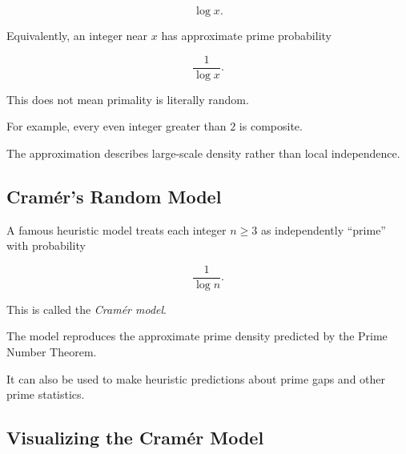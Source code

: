 \[ \log x. \]

Equivalently, an integer near \(x\) has approximate prime probability

\[ \frac1{\log x}. \]

This does not mean primality is literally random.

For example, every even integer greater than \(2\) is composite.

The approximation describes large-scale density rather than local
independence.

\subsection{Cramér's Random Model}
\label{subsec:cramer-random-model}

A famous heuristic model treats each integer \(n\geq3\) as independently
``prime'' with probability

\[ \boxed{\frac1{\log n}.} \]

This is called the \emph{Cramér model}.

The model reproduces the approximate prime density predicted by the Prime
Number Theorem.

It can also be used to make heuristic predictions about prime gaps and other
prime statistics.

\subsection{Visualizing the Cramér Model}
\label{subsec:cramer-model-visual}

\begin{centereddiagram}
\end{centereddiagram}

